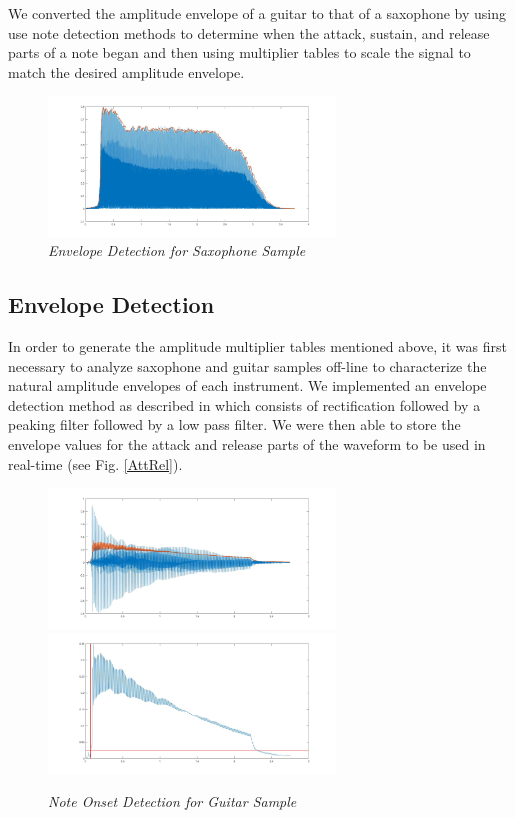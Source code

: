 \documentclass[twoside,a4paper]{article}
\begin{document}
\noindent
We converted the amplitude envelope of a
guitar to that of a saxophone by using use note detection methods to determine when
the attack, sustain, and release parts of a note began
and then using multiplier
tables to scale the signal to match the desired amplitude envelope.

\begin{figure}[ht]
  \includegraphics[width=3in]{Pictures/EnvDetection.jpg}
  \centering
  \caption{\label{SaxEnv} {\it Envelope Detection for Saxophone Sample}}
  \end{figure}

\subsection{Envelope Detection}
In order to generate the amplitude multiplier tables mentioned above,
it was first necessary to analyze saxophone and guitar samples off-line
to characterize the natural amplitude envelopes of each instrument. We
implemented an envelope detection method as described in \cite{DBLP:journals/corr/Jarne17}
which consists of rectification followed by a peaking filter followed by a low pass filter.
We were then able to store the envelope values for the attack and release parts of the waveform
to be used in real-time (see Fig. \ref{AttRel}).

\begin{figure}[ht]
  \includegraphics[width=3in]{Pictures/NoteDetect1.jpg}
  \includegraphics[width=3in]{Pictures/NoteDetect2.jpg}
  \caption{\label{Onset} {\it Note Onset Detection for Guitar Sample}}
  \centering
  \end{figure}
\end{document}
